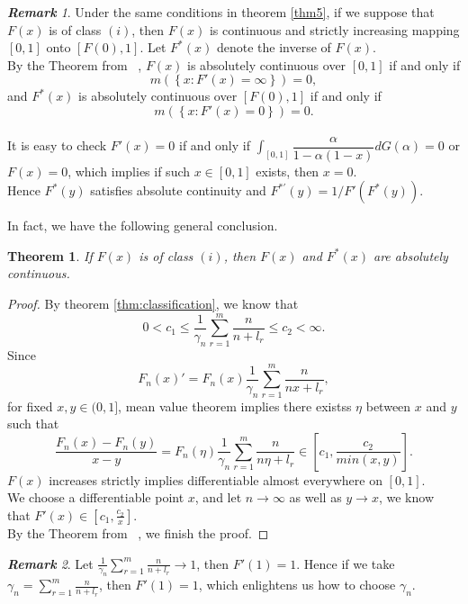 \documentclass[12pt]{article}
\theoremstyle{plain}
\newtheorem{thm}{\textbf{Theorem}}
\theoremstyle{definition}
\theoremstyle{remark}
\newtheorem{rem}{\textbf{Remark}}
\begin{document}
\begin{rem}
    Under the same conditions in theorem \ref{thm5}, if we suppose that $F(x)$ is of class $(i)$, then $F(x)$ is continuous and strictly increasing mapping $[0,1]$ onto $[F(0),1]$. Let $F^*(x)$ denote the inverse of $F(x)$. \\
    By the Theorem from ~\cite{abs},  $F(x)$ is absolutely continuous over $[0,1]$ if and only if
    \begin{equation*}
    m\left(\left\{x : F'(x)=\infty \right\}\right)=0,
    \end{equation*}
     and $F^*(x)$ is absolutely continuous over $[F(0),1]$ if and only if
    \begin{equation*}
        m\left(\left\{x : F'(x)=0\right\}\right)=0.
    \end{equation*}\\
    It is easy to check $F'(x)=0$ if and only if $\int_{[0,1]}\dfrac{\alpha}{1-\alpha(1-x)}dG(\alpha)=0$ or $F(x)=0$, which implies if such $x\in [0,1]$ exists, then $x=0$.\\
    Hence $F^*(y)$ satisfies absolute continuity and $F^{*\prime}(y)=1/F'(F^*(y))$.
\end{rem}

In fact, we have the following general conclusion.
\begin{thm}\label{absFF*}
    If $F(x)$ is of class $(i)$, then $F(x)$ and $F^*(x)$ are absolutely continuous.
\end{thm}
\begin{proof}
By theorem \ref{thm:classification}, we know that
\begin{equation*}
0<c_{1} \leqslant \frac{1}{\gamma_{n}} \sum_{r=1}^{m} \frac{n}{n+l_{r}} \leqslant c_{2}<\infty.
\end{equation*}
Since
\begin{equation*}
F_n(x)'=F_n(x)\dfrac{1}{\gamma_{n}}\sum_{r=1}^{m}\dfrac{n}{nx+l_r},
\end{equation*}
for fixed $x,y\in(0,1]$, mean value theorem implies there existss $\eta$ between $x$ and $y$ such that
\begin{equation*}
\dfrac{F_n(x)-F_n(y)}{x-y}=F_n(\eta)\frac{1}{\gamma_{n}} \sum_{r=1}^{m} \frac{n}{n\eta+l_{r}}\in [c_1,\frac{c_2}{min(x,y)}].
\end{equation*}
$F(x)$ increases strictly implies differentiable almost everywhere on $[0,1]$. \\
We choose a differentiable point $x$, and let $n\rightarrow \infty$ as well as $y\rightarrow x$, we know that $F'(x)\in [c_1,\frac{c_2}{x}]$. \\
By the Theorem from ~\cite{abs}, we finish the proof.
\end{proof}
\begin{rem}
    Let $\frac{1}{\gamma_{n}} \sum_{r=1}^{m} \frac{n}{n+l_{r}}\rightarrow 1$, then $F'(1)=1$. Hence if we take $\gamma_n=\sum_{r=1}^{m} \frac{n}{n+l_{r}}$, then $F'(1)=1$, which enlightens us how to choose $\gamma_n$.
\end{rem}
\end{document}
